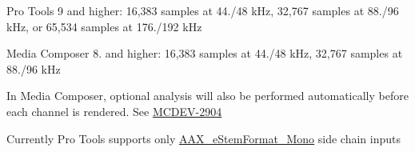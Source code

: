 \begin{DoxyRefList}
\begin{DoxyItemize}
\item Pro Tools 9 and higher\+: 16,383 samples at 44./48 k\+Hz, 32,767 samples at 88./96 k\+Hz, or 65,534 samples at 176./192 k\+Hz
\item Media Composer 8. and higher\+: 16,383 samples at 44./48 k\+Hz, 32,767 samples at 88./96 k\+Hz  
\end{DoxyItemize}
\item[Member \mbox{\hyperlink{a00737_a13e384f22825afd3db6d68395b79ce0da5a2bacb421fc36f890a121f01a9e72ba}{AAX\+\_\+e\+Property\+\_\+\+Optional\+Analysis}} ]\label{a00879__compatibility_notes000065}%
%
 In Media Composer, optional analysis will also be performed automatically before each channel is rendered. See \mbox{\hyperlink{a00944_MCDEV-2904}{MCDEV-\/2904}} 
\item[Member \mbox{\hyperlink{a00737_a13e384f22825afd3db6d68395b79ce0dae71ad10ce55fb8c4076fe70315b689ae}{AAX\+\_\+e\+Property\+\_\+\+Side\+Chain\+Stem\+Format}} ]\label{a00879__compatibility_notes000063}%
%
 Currently Pro Tools supports only \mbox{\hyperlink{a00524_ad8af5ef008b2bd478add9a0acb0a1d85a0cc08ddb9923a4093c820efe84588947}{AAX\+\_\+e\+Stem\+Format\+\_\+\+Mono}} side chain inputs


\end{DoxyRefList}
